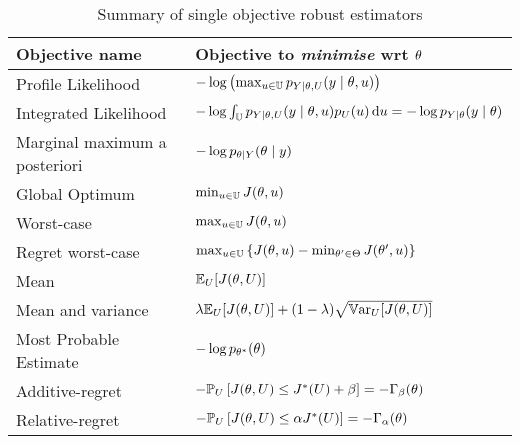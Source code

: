 \documentclass[../../Main_ManuscritThese.tex]{subfiles}
\begin{document}
\begin{table}[ht]
  \centering
  \begin{tabular}{ll}
    \toprule
    Objective name                & Objective to \emph{minimise} wrt $\theta$                                                                                 \\ \midrule
    Profile Likelihood            & $-\log \left(\max_{u \in \mathbb{U}} p_{Y \mid \theta, U}(y \mid \theta, u)\right)$                                       \\
    Integrated Likelihood         & $-\log \int_{\mathbb{U}} p_{Y \mid \theta, U}(y \mid \theta, u)p_{U}(u) \,\mathrm{d}u=-\log p_{Y\mid \theta}(y\mid \theta)$ \\
    Marginal maximum a posteriori & $-\log p_{\theta\mid Y}(\theta \mid y)$                                                                                      \\ \midrule
    Global Optimum                & $\min_{u\in\mathbb{U}} J(\theta, u)$                                                                                     \\
    Worst-case                    & $\max_{u \in \mathbb{U}} J(\theta, u)$                                                                                   \\
    Regret worst-case             & $\max_{u\in\mathbb{U}}\left\{J(\theta, u) - \min_{\theta^{\prime}\in\Theta} J(\theta^{\prime}, u)\right\}$                  \\ \midrule
    Mean                          & $\mathbb{E}_{U}[J(\theta, U)]$                                                                                               \\
    Mean and variance             & $ \lambda \mathbb{E}_{U}[J(\theta, U)] + (1-\lambda) \sqrt{\mathbb{V}\mathrm{ar}_{U}[J(\theta, U)]}$                                         \\ \midrule
    Most Probable Estimate        & $-\log p_{\theta^*}(\theta)$                                                                                                 \\
    Additive-regret               & $-\mathbb{P}_{U}\left[J(\theta, U) \leq J^*(U) + \beta \right]=-\Gamma_{\beta}(\theta)$                                     \\
    Relative-regret               & $-\mathbb{P}_{U}\left[J(\theta, U) \leq \alpha J^*(U) \right]=-\Gamma_{\alpha}(\theta) $                                    \\ \bottomrule
  \end{tabular}
  \caption{\label{tab:summary_robust} Summary of single objective robust estimators}
\end{table}
 
\end{document}

